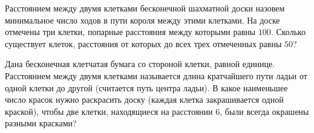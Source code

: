 \documentclass[12pt]{book}
\begin{document}
\begin{task}
Расстоянием между двумя клетками бесконечной шахматной доски назовем минимальное число ходов в пути короля между этими клетками. На доске отмечены три клетки, попарные расстояния между которыми равны $100$. Сколько существует клеток, расстояния от которых до всех трех отмеченных равны $50$?
\end{task}


\begin{task}
Дана бесконечная клетчатая бумага со стороной клетки, равной единице. Расстоянием между двумя клетками называется длина кратчайшего пути ладьи от одной клетки до другой (считается путь центра ладьи). В какое наименьшее число красок нужно раскрасить доску (каждая клетка закрашивается одной краской), чтобы две клетки, находящиеся на расстоянии 6, были всегда окрашены разными красками?
\end{task}
\end{document}
